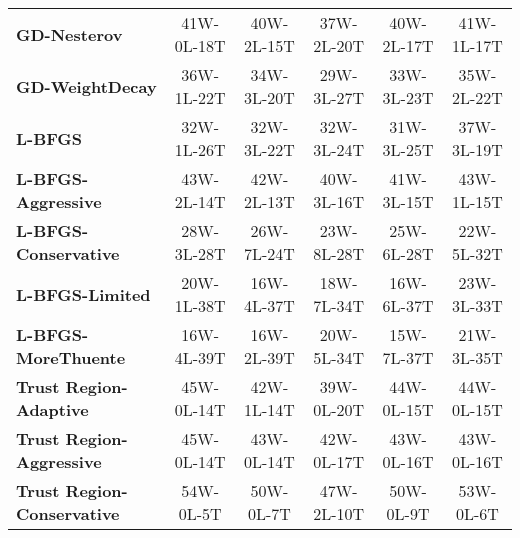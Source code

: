 \documentclass[10pt]{article}
\begin{document}
\begin{table}[H]
{\begin{tabular}{lccccc}
\textbf{GD-Nesterov} & \textcolor{green!70!black}{41W-0L-18T} & \textcolor{green!70!black}{40W-2L-15T} & \textcolor{green!70!black}{37W-2L-20T} & \textcolor{green!70!black}{40W-2L-17T} & \textcolor{green!70!black}{41W-1L-17T} \\
\textbf{GD-WeightDecay} & \textcolor{green!70!black}{36W-1L-22T} & \textcolor{green!70!black}{34W-3L-20T} & \textcolor{green!70!black}{29W-3L-27T} & \textcolor{green!70!black}{33W-3L-23T} & \textcolor{green!70!black}{35W-2L-22T} \\
\textbf{L-BFGS} & \textcolor{green!70!black}{32W-1L-26T} & \textcolor{green!70!black}{32W-3L-22T} & \textcolor{green!70!black}{32W-3L-24T} & \textcolor{green!70!black}{31W-3L-25T} & \textcolor{green!70!black}{37W-3L-19T} \\
\textbf{L-BFGS-Aggressive} & \textcolor{green!70!black}{43W-2L-14T} & \textcolor{green!70!black}{42W-2L-13T} & \textcolor{green!70!black}{40W-3L-16T} & \textcolor{green!70!black}{41W-3L-15T} & \textcolor{green!70!black}{43W-1L-15T} \\
\textbf{L-BFGS-Conservative} & \textcolor{green!70!black}{28W-3L-28T} & \textcolor{green!70!black}{26W-7L-24T} & \textcolor{green!70!black}{23W-8L-28T} & \textcolor{green!70!black}{25W-6L-28T} & \textcolor{green!70!black}{22W-5L-32T} \\
\textbf{L-BFGS-Limited} & \textcolor{green!70!black}{20W-1L-38T} & \textcolor{green!70!black}{16W-4L-37T} & \textcolor{green!70!black}{18W-7L-34T} & \textcolor{green!70!black}{16W-6L-37T} & \textcolor{green!70!black}{23W-3L-33T} \\
\textbf{L-BFGS-MoreThuente} & \textcolor{green!70!black}{16W-4L-39T} & \textcolor{green!70!black}{16W-2L-39T} & \textcolor{green!70!black}{20W-5L-34T} & \textcolor{green!70!black}{15W-7L-37T} & \textcolor{green!70!black}{21W-3L-35T} \\
\textbf{Trust Region-Adaptive} & \textcolor{green!70!black}{45W-0L-14T} & \textcolor{green!70!black}{42W-1L-14T} & \textcolor{green!70!black}{39W-0L-20T} & \textcolor{green!70!black}{44W-0L-15T} & \textcolor{green!70!black}{44W-0L-15T} \\
\textbf{Trust Region-Aggressive} & \textcolor{green!70!black}{45W-0L-14T} & \textcolor{green!70!black}{43W-0L-14T} & \textcolor{green!70!black}{42W-0L-17T} & \textcolor{green!70!black}{43W-0L-16T} & \textcolor{green!70!black}{43W-0L-16T} \\
\textbf{Trust Region-Conservative} & \textcolor{green!70!black}{54W-0L-5T} & \textcolor{green!70!black}{50W-0L-7T} & \textcolor{green!70!black}{47W-2L-10T} & \textcolor{green!70!black}{50W-0L-9T} & \textcolor{green!70!black}{53W-0L-6T} \\

\end{tabular}}
\end{table}
\end{document}
